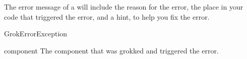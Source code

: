     The error message of a  will include the reason for the
    error, the place in your code that triggered the error, and a hint, to help
    you fix the error.

    \begin{classdesc}{GrokError}{Exception}
        \begin{memberdesc}{component}
            The component that was grokked and triggered the error.
        \end{memberdesc}
    \end{classdesc}
